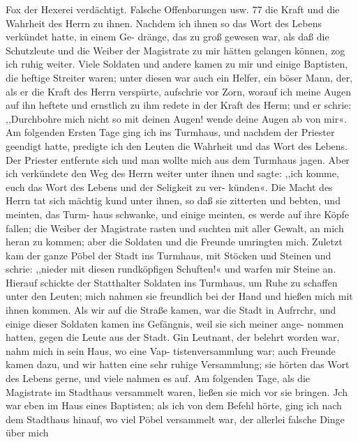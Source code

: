 Fox der Hexerei verdächtigt. Falsche Offenbarungen usw. 77
die Kraft und die Wahrheit des Herrn zu ihnen. Nachdem ich
ihnen so das Wort des Lebens verkündet hatte, in einem Ge-
dränge, das zu groß gewesen war, als daß die Schutzleute und
die Weiber der Magistrate zu mir hätten gelangen können, zog
ich ruhig weiter. Viele Soldaten und andere kamen zu mir und
einige Baptisten, die heftige Streiter waren; unter diesen war
auch ein Helfer, ein böser Mann, der, als er die Kraft des Herrn
verspürte, aufschrie vor Zorn, worauf ich meine Augen auf ihn
heftete und ernstlich zu ihm redete in der Kraft des Herm; und
er schrie: ,,Durchbohre mich nicht so mit deinen Augen! wende
deine Augen ab von mir«.
Am folgenden Ersten Tage ging ich ins Turmhaus, und
nachdem der Priester geendigt hatte, predigte ich den Leuten
die Wahrheit und das Wort des Lebens. Der Priester entfernte
sich und man wollte mich aus dem Turmhaus jagen. Aber ich
verkündete den Weg des Herrn weiter unter ihnen und sagte:
,,ich komme, euch das Wort des Lebens und der Seligkeit zu ver-
künden«. Die Macht des Herrn tat sich mächtig kund unter
ihnen, so daß sie zitterten und bebten, und meinten, das Turm-
haus schwanke, und einige meinten, es werde auf ihre Köpfe fallen;
die Weiber der Magistrate rasten und suchten mit aller Gewalt,
an mich heran zu kommen; aber die Soldaten und die Freunde
umringten mich. Zuletzt kam der ganze Pöbel der Stadt ins
Turmhaus, mit Stöcken und Steinen und schrie: ,,nieder mit
diesen rundköpfigen Schuften!« und warfen mir Steine an.
Hierauf schickte der Statthalter Soldaten ins Turmhaus, um
Ruhe zu schaffen unter den Leuten; mich nahmen sie freundlich
bei der Hand und hießen mich mit ihnen kommen. Als wir
auf die Straße kamen, war die Stadt in Aufrrchr, und einige
dieser Soldaten kamen ins Gefängnis, weil sie sich meiner ange-
nommen hatten, gegen die Leute aus der Stadt. Gin Leutnant,
der belehrt worden war, nahm mich in sein Haus, wo eine Vap-
tistenversammlung war; auch Freunde kamen dazu, und wir hatten
eine sehr ruhige Versammlung; sie hörten das Wort des Lebens
gerne, und viele nahmen es auf. Am folgenden Tage, als die
Magistrate im Stadthaus versammelt waren, ließen sie mich vor
sie bringen. Jch war eben im Haus eines Baptisten; als ich
von dem Befehl hörte, ging ich nach dem Stadthaus hinauf, wo
viel Pöbel versammelt war, der allerlei falsche Dinge über mich


